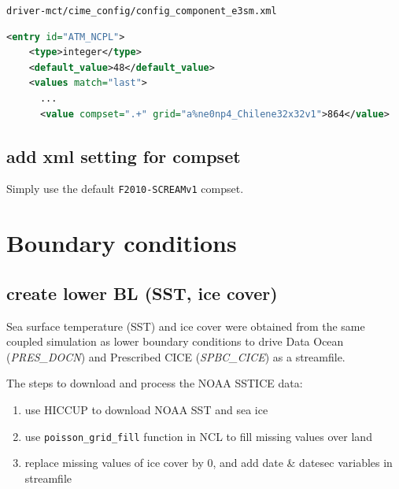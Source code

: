 \documentclass[journal abbreviation, manuscript]{copernicus}
\begin{document}
\lstinline|driver-mct/cime_config/config_component_e3sm.xml|
\begin{lstlisting}[language=XML, numbers=none, style=style2]
  <entry id="ATM_NCPL">
    <type>integer</type>
    <default_value>48</default_value>
    <values match="last">
      ...
      <value compset=".+" grid="a%ne0np4_Chilene32x32v1">864</value>
\end{lstlisting}


\subsection{add xml setting for compset}
Simply use the default \verb|F2010-SCREAMv1| compset. 








\newpage
\section{Boundary conditions}


\subsection{create lower BL (SST, ice cover)}

Sea surface temperature (SST) and ice cover were obtained from the same coupled simulation as lower boundary conditions to drive Data Ocean (\emph{PRES\_DOCN}) and Prescribed CICE (\emph{SPBC\_CICE}) as a streamfile. 

The steps to download and process the NOAA SSTICE data:
\begin{enumerate}
  \item use HICCUP to download NOAA SST and sea ice
  \item use \verb|poisson_grid_fill| function in NCL to fill missing values over land
  \item replace missing values of ice cover by 0, and add date \& datesec variables in streamfile
\end{enumerate}
\vspace{\baselineskip}
\end{document}
